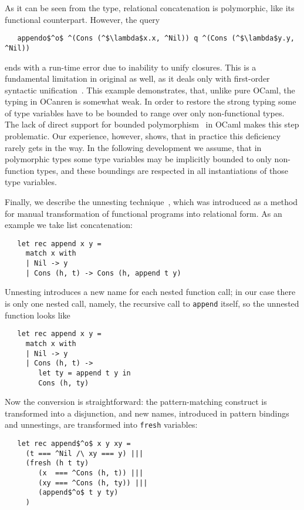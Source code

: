 As it can be seen from the type, relational concatenation is polymorphic, like its functional counterpart. However, the query

\begin{lstlisting}
   appendo$^o$ ^(Cons (^$\lambda$x.x, ^Nil)) q ^(Cons (^$\lambda$y.y, ^Nil))  
\end{lstlisting}

\noindent ends with a run-time error due to inability to unify closures. This is a fundamental limitation in original \miniKanren as well, as it deals only with first-order syntactic unification~\cite{Unification}. This example demonstrates, that, unlike pure OCaml, the typing in OCanren is somewhat weak. In order to restore the strong typing some of type variables have to be bounded to range over only non-functional types. The lack of direct support for bounded polymorphism~\cite{cardelli} in OCaml makes this step problematic. Our experience, however, shows, that in practice this deficiency rarely gets in the way. In the following development we assume, that in polymorphic types some type variables may be implicitly bounded to only non-function types, and these boundings are respected in all instantiations of those type variables.

Finally, we describe the unnesting technique~\cite{TRS}, which was introduced as a method for manual transformation
of functional programs into relational form. As an example we take list concatenation:

\begin{lstlisting}
   let rec append x y =
     match x with
     | Nil -> y
     | Cons (h, t) -> Cons (h, append t y)
\end{lstlisting}

Unnesting introduces a new name for each nested function call; in our case there is only one nested call, namely,
the recursive call to \lstinline|append| itself, so the unnested function looks like

\begin{lstlisting}
   let rec append x y =
     match x with 
     | Nil -> y
     | Cons (h, t) -> 
        let ty = append t y in
        Cons (h, ty)
\end{lstlisting}

Now the conversion is straightforward: the pattern-matching construct is transformed into a disjunction, and new names,
introduced in pattern bindings and unnestings, are transformed into \lstinline|fresh| variables:

\begin{lstlisting}
   let rec append$^o$ x y xy =
     (t === ^Nil /\ xy === y) |||
     (fresh (h t ty)
        (x  === ^Cons (h, t)) |||
        (xy === ^Cons (h, ty)) |||
        (append$^o$ t y ty)
     )
\end{lstlisting}

